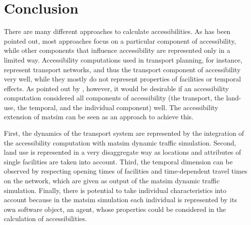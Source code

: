 \section{Conclusion}
There are many different approaches to calculate accessibilities. As has been pointed out, most approaches focus
on a particular component of accessibility, while other components that influence accessibility are 
represented only in a limited way. Accessibility computations used in transport planning, for instance, represent 
transport networks, and thus the transport component of accessibility very well, while they mostly do not represent
properties of facilities or temporal effects. As pointed out by \citet{Geurs2004AccessibilityReview}, however, it
would be desirable if an accessibility computation considered all components of accessibility (\ie the transport, 
the land-use, the temporal, and the individual component) well. The accessibility extension of \gls{matsim} can 
be seen as an approach to achieve this. 

First, the dynamics of the transport system are represented by the integration of the accessibility 
computation with \gls{matsim} dynamic traffic simulation. 
Second, land use is represented in a very disaggregate way as locations and attributes of single facilities are
taken into account.
Third, the temporal dimension can be observed by respecting opening times of facilities and time-dependent
travel times on the network, which are given as output of the \gls{matsim} dynamic traffic simulation.
Finally, there is potential to take individual characteristics into account because in the \gls{matsim} simulation 
each individual is represented by its own software object, \ie an agent, whose properties could be
considered in the calculation of accessibilities.


